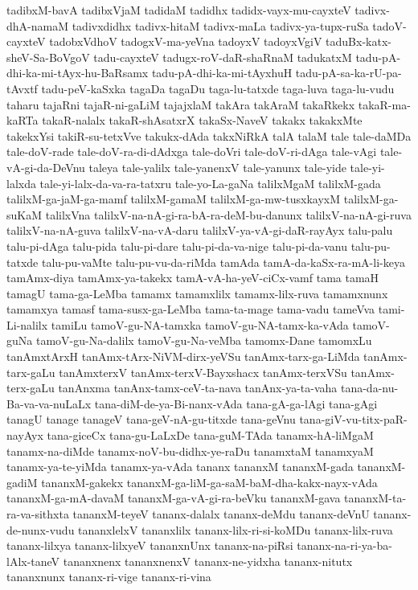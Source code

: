 {tadibxM-bavA
tadibxVjaM
tadidaM
tadidhx
tadidx-vayx-mu-cayxteV
tadivx-dhA-namaM
tadivxdidhx
tadivx-hitaM
tadivx-maLa
tadivx-ya-tupx-ruSa
tadoV-cayxteV
tadobxVdhoV
tadogxV-ma-yeVna
tadoyxV
tadoyxVgiV
taduBx-katx-sheV-Sa-BoVgoV
tadu-cayxteV
tadugx-roV-daR-shaRnaM
tadukatxM
tadu-pA-dhi-ka-mi-tAyx-hu-BaRsamx
tadu-pA-dhi-ka-mi-tAyxhuH
tadu-pA-sa-ka-rU-pa-tAvxtf
tadu-peV-kaSxka
tagaDa
tagaDu
taga-lu-tatxde
taga-luva
taga-lu-vudu
taharu
tajaRni
tajaR-ni-gaLiM
tajajxlaM
takAra
takAraM
takaRkekx
takaR-ma-kaRTa
takaR-nalalx
takaR-shAsatxrX
takaSx-NaveV
takakx
takakxMte
takekxYsi
takiR-su-tetxVve
takukx-dAda
takxNiRkA
talA
talaM
tale
tale-daMDa
tale-doV-rade
tale-doV-ra-di-dAdxga
tale-doVri
tale-doV-ri-dAga
tale-vAgi
tale-vA-gi-da-DeVnu
taleya
tale-yalilx
tale-yanenxV
tale-yanunx
tale-yide
tale-yi-lalxda
tale-yi-lalx-da-va-ra-tatxru
tale-yo-La-gaNa
talilxMgaM
talilxM-gada
talilxM-ga-jaM-ga-mamf
talilxM-gamaM
talilxM-ga-mw-tusxkayxM
talilxM-ga-suKaM
talilxVna
talilxV-na-nA-gi-ra-bA-ra-deM-bu-danunx
talilxV-na-nA-gi-ruva
talilxV-na-nA-guva
talilxV-na-vA-daru
talilxV-ya-vA-gi-daR-rayAyx
talu-palu
talu-pi-dAga
talu-pida
talu-pi-dare
talu-pi-da-va-nige
talu-pi-da-vanu
talu-pu-tatxde
talu-pu-vaMte
talu-pu-vu-da-riMda
tamAda
tamA-da-kaSx-ra-mA-li-keya
tamAmx-diya
tamAmx-ya-takekx
tamA-vA-ha-yeV-ciCx-vamf
tama
tamaH
tamagU
tama-ga-LeMba
tamamx
tamamxlilx
tamamx-lilx-ruva
tamamxnunx
tamamxya
tamasf
tama-susx-ga-LeMba
tama-ta-mage
tama-vadu
tameVva
tami-Li-nalilx
tamiLu
tamoV-gu-NA-tamxka
tamoV-gu-NA-tamx-ka-vAda
tamoV-guNa
tamoV-gu-Na-dalilx
tamoV-gu-Na-veMba
tamomx-Dane
tamomxLu
tanAmxtArxH
tanAmx-tArx-NiVM-dirx-yeVSu
tanAmx-tarx-ga-LiMda
tanAmx-tarx-gaLu
tanAmxterxV
tanAmx-terxV-Bayxshacx
tanAmx-terxVSu
tanAmx-terx-gaLu
tanAnxma
tanAnx-tamx-ceV-ta-nava
tanAnx-ya-ta-vaha
tana-da-nu-Ba-va-va-nuLaLx
tana-diM-de-ya-Bi-nanx-vAda
tana-gA-ga-lAgi
tana-gAgi
tanagU
tanage
tanageV
tana-geV-nA-gu-titxde
tana-geVnu
tana-giV-vu-titx-paR-nayAyx
tana-giceCx
tana-gu-LaLxDe
tana-guM-TAda
tanamx-hA-liMgaM
tanamx-na-diMde
tanamx-noV-bu-didhx-ye-raDu
tanamxtaM
tanamxyaM
tanamx-ya-te-yiMda
tanamx-ya-vAda
tananx
tananxM
tananxM-gada
tananxM-gadiM
tananxM-gakekx
tananxM-ga-liM-ga-saM-baM-dha-kakx-nayx-vAda
tananxM-ga-mA-davaM
tananxM-ga-vA-gi-ra-beVku
tananxM-gava
tananxM-ta-ra-va-sithxta
tananxM-teyeV
tananx-dalalx
tananx-deMdu
tananx-deVnU
tananx-de-nunx-vudu
tananxlelxV
tananxlilx
tananx-lilx-ri-si-koMDu
tananx-lilx-ruva
tananx-lilxya
tananx-lilxyeV
tananxnUnx
tananx-na-piRsi
tananx-na-ri-ya-ba-lAlx-taneV
tananxnenx
tananxnenxV
tananx-ne-yidxha
tananx-nitutx
tananxnunx
tananx-ri-vige
tananx-ri-vina
}
